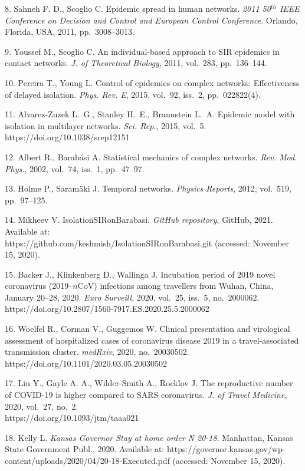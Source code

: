 {8.  Sahneh F. D.,   Scoglio C.  Epidemic spread in human networks. \textit{2011 50$^{th}$ IEEE Conference on Decision and Control and European Control Conference}. Orlando, Florida, USA, 2011, pp.~3008--3013.

9. Youssef M., Scoglio C. An individual-based approach to SIR epidemics in contact networks. \textit{J. of Theoretical Biology}, 2011, vol.~283, pp.~136--144.

10. Pereira T., Young L. Control of epidemics on complex networks:
Effectiveness of delayed isolation. \textit{Phys. Rev. E}, 2015, vol.~92, iss.~2, pp.~022822(4).

11.  Alvarez-Zuzek L.~G.,  Stanley H.~E., Braunstein
L.~A. Epidemic model with isolation in multilayer networks. \textit{Sci.  Rep.}, 2015, vol.~5. https://doi.org/10.1038/srep12151

12. Albert R., Barab\'asi A. Statistical mechanics of complex networks. \textit{Rev. Mod. Phys.}, 2002, vol.~74, iss.~1, pp.~47--97.

13. Holme P., Saram\"{a}ki J. Temporal networks. \textit{Physics Reports}, 2012, vol.~519, pp.~97--125.

14. Mikheev V. IsolationSIRonBarabasi. \textit{GitHub repository}, GitHub, 2021. Available at: \\ https://github.com/keshmish/IsolationSIRonBarabasi.git (accessed: November 15, 2020).

15. Backer J., Klinkenberg D., Wallinga J. Incubation period of 2019 novel coronavirus (2019--$n$CoV) infections among travellers from Wuhan, China, January 20--28, 2020. \textit{Euro Surveill}, 2020, vol.~25, iss.~5, no.~2000062. https://doi.org/10.2807/1560-7917.ES.2020.25.5.2000062

16. Woelfel R., Corman V., Guggemos W. Clinical presentation and virological assessment of hospitalized cases of coronavirus disease 2019 in a travel-associated transmission cluster.
\textit{medRxiv}, 2020, no.~20030502. https://doi.org/10.1101/2020.03.05.20030502

17.  Liu Y.,  Gayle A. A.,  Wilder-Smith A.,  Rocklov J.
The reproductive number of COVID-19 is higher compared to SARS coronavirus. \textit{J. of Travel Medicine}, 2020, vol.~27,  no.~2.\\
https://doi.org/10.1093/jtm/taaa021

18. Kelly L. \textit{Kansas Governor Stay at home order N 20-18}. Manhattan,
Kansas State Government Publ., 2020. Available at:
https://governor.kansas.gov/wp-content/uploads/2020/04/20-18-Executed.pdf
 (accessed: November 15, 2020).


}
